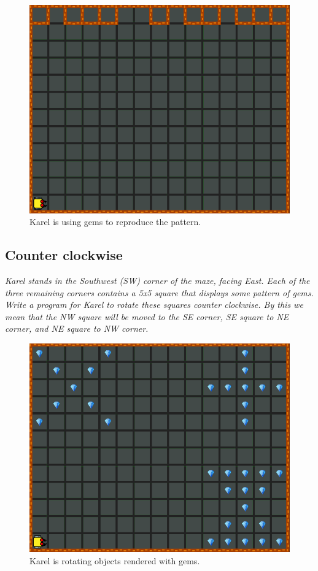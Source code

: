 \begin{figure}[!ht]
\begin{center}
\includegraphics[height=0.4\textwidth]{img/h03.png}
\end{center}
\vspace{-4mm}
\caption{Karel is using gems to reproduce the pattern.}
\vspace{-1.2cm}
\label{fig:h03}
\end{figure}


\subsection{Counter clockwise}

{\em Karel stands in the Southwest (SW) corner of the maze, facing East. Each of the three remaining corners contains a 5x5 square that displays some pattern of gems. Write a program for Karel to rotate these squares counter clockwise. By this we mean that the NW square will be moved to the SE corner, SE square to NE corner, and NE square to NW corner.}\\[-9mm]

\begin{figure}[!ht]
\begin{center}
\includegraphics[height=0.4\textwidth]{img/h04.png}
\end{center}
\vspace{-4mm}
\caption{Karel is rotating objects rendered with gems.}
\vspace{-1.2cm}
\label{fig:h04}
\end{figure}
\newpage




